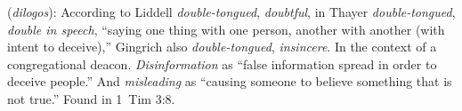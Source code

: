 \item[Disinforming,]

(\textit{dilogos}):
According to Liddell \emph{double-tongued}, \emph{doubtful}, in Thayer \emph{double-tongued}, \emph{double in speech}, ``saying one thing with one person, another with another (with intent to deceive),'' Gingrich also \emph{double-tongued}, \emph{insincere}. In the context of a congregational deacon. \emph{Disinformation} as ``false information spread in order to deceive people.'' And \emph{misleading} as ``causing someone to believe something that is not true.''
Found in 1~Tim 3:8.
